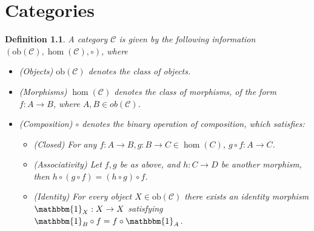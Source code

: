 \documentclass[11pt]{report}
\newcommand{\mcC}{\mathcal{C}}
\newcommand{\ob}{\text{ob}}
\newtheorem{defn}[thm]{Definition} %
\begin{document}
\chapter{Categories}
\begin{defn}
  A category $\mcC$ is given by the following information $(\ob(\mcC), \hom(\mcC), \circ)$, where
  \begin{itemize}
  \item (Objects) $\ob(\mcC)$ denotes the class of objects. \\
  \item (Morphisms) $\hom(\mcC)$ denotes the class of morphisms, of the form $f:A \to B$, where $A, B \in ob(\mcC)$. \\
  \item (Composition) $\circ$ denotes the binary operation of composition, which satisfies:
    \begin{itemize}
    \item (Closed) For any $f: A \to B, g:B \to C \in \hom(C)$, $g \circ f: A \to C$. \\
    \item (Associativity) Let $f,g$ be as above, and $h:C \to D$ be another morphism, then $h \circ (g \circ f) = (h \circ g) \circ f$. \\
    \item (Identity) For every object $X \in \ob(\mcC)$ there exists an identity morphism $\mathbbm{1}_X:X \to X$ satisfying
      $\mathbbm{1}_B \circ f = f \circ \mathbbm{1}_A$.
    \end{itemize}
  \end{itemize}
\end{defn}
\end{document}

